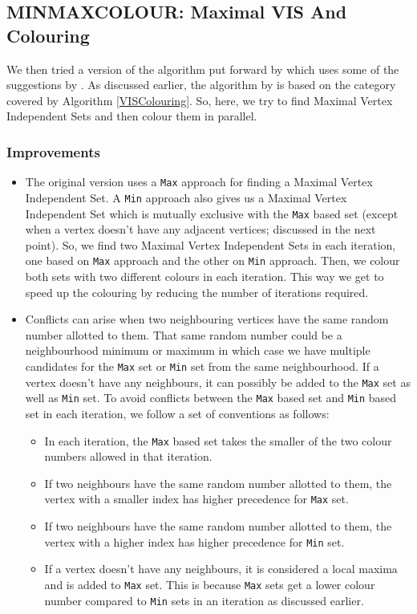 \documentclass[MTech]{iitmdiss}
\begin{document}
\subsection{MINMAXCOLOUR: Maximal VIS And Colouring}
We then tried a version of the algorithm put forward by \citet{Jones:1993:PGC:153109.153119} which uses some of the suggestions by \citet{cohenefficient}. As discussed earlier, the algorithm by \citet{Jones:1993:PGC:153109.153119} is based on the category covered by Algorithm \ref{VISColouring}. So, here, we try to find Maximal Vertex Independent Sets and then colour them in parallel. 
\subsubsection{Improvements}
\begin{itemize}
\item The original version uses a \verb+Max+ approach for finding a Maximal Vertex Independent Set. A \verb+Min+ approach also gives us a Maximal Vertex Independent Set which is mutually exclusive with the \verb+Max+ based set (except when a vertex doesn't have any adjacent vertices; discussed in the next point). So, we find two Maximal Vertex Independent Sets in each iteration, one based on \verb+Max+ approach and the other on \verb+Min+ approach. Then, we colour both sets with two different colours in each iteration. This way we get to speed up the colouring by reducing the number of iterations required. 
\item Conflicts can arise when two neighbouring vertices have the same random number allotted to them. That same random number could be a neighbourhood minimum or maximum in which case we have multiple candidates for the \verb+Max+ set or \verb+Min+ set from the same neighbourhood. If a vertex doesn't have any neighbours, it can possibly be added to the  \verb+Max+ set as well as \verb+Min+ set. To avoid conflicts between the \verb+Max+ based set and \verb+Min+ based set in each iteration, we follow a set of conventions as follows:
\begin{itemize}
\item In each iteration, the \verb+Max+ based set takes the smaller of the two colour numbers allowed in that iteration.
\item If two neighbours have the same random number allotted to them, the vertex with a smaller index has higher precedence for \verb+Max+ set.
\item If two neighbours have the same random number allotted to them, the vertex with a higher index has higher precedence for \verb+Min+ set.
\item If a vertex doesn't have any neighbours, it is considered a local maxima and is added to \verb+Max+ set. This is because \verb+Max+ sets get a lower colour number compared to \verb+Min+ sets in an iteration as discussed earlier. 
\end{itemize}
\end{itemize}
\end{document}

